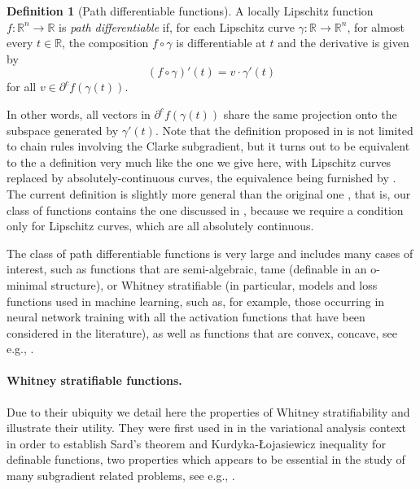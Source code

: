 \documentclass[11pt]{article}
\theoremstyle{definition}
\newtheorem{defn}[thm]{Definition}
\theoremstyle{remark}
\newcommand{\R}{\mathbb{R}}
\begin{document}
\begin{defn}[Path differentiable functions]\label{def:pathdiff}
 A locally Lipschitz function $f\colon\R^n\to\R$ is \emph{path differentiable} if, for each Lipschitz curve $\gamma\colon\R\to\R^n$, for almost every $t\in\R$, the composition $f\circ\gamma$ is differentiable at $t$ and the derivative is given by
 \[(f\circ\gamma)'(t)=v\cdot \gamma'(t)\]
 for all $v\in\partial^cf(\gamma(t))$.
\end{defn}

In other words, all vectors in $\partial^cf(\gamma(t))$ share the same projection onto the subspace generated by $\gamma'(t)$. 
Note that the definition proposed in \cite{boltepauwels} is not limited to chain rules involving the Clarke subgradient, but it turns out to be equivalent to the a definition very much like the one we give here, with Lipschitz curves replaced by absolutely-continuous curves,
%
the equivalence being furnished by \cite[Corollary 2]{boltepauwels}. 
The current definition is slightly more  general than the original one \cite{boltepauwels}, that is, our class of functions contains the one discussed in \cite{boltepauwels}, because we require a condition only for Lipschitz curves, which are all absolutely continuous. %

The class of path differentiable functions is very large and includes many cases of interest, such as functions that are  semi-algebraic, tame (definable in an o-minimal structure), or Whitney stratifiable \cite{Davis2019} (in particular, models and loss functions used in machine learning, such as, for example, those occurring in neural network training with all the activation functions that have been considered in the literature), as well as functions that are %
convex, concave, %
see e.g.,  \cite{boltepauwels,scholtes2012introduction}. 
%
%



\paragraph{Whitney stratifiable functions.} Due to their ubiquity we detail here the properties of Whitney stratifiability and illustrate their utility. They  were first used in  \cite{Bolte2007} in the variational analysis context in order to establish Sard's theorem and Kurdyka-\L ojasiewicz inequality for definable functions, two properties which appears to be essential in the study of many subgradient related problems, see e.g.,  \cite{attouchboltesvaiter,bolte2014proximal}.
\end{document}
